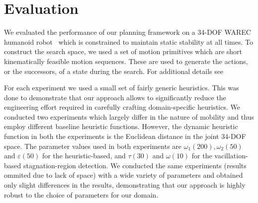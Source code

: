 \documentclass{article}
\begin{document}
\section{Evaluation }
\label{sec:eval}
We evaluated the performance of our planning framework on a 34-DOF WAREC humanoid robot~\cite{MHSetal15} 
which is constrained to maintain static stability at all times. 
%
To construct the search space, we used a set of motion primitives which are short kinematically feasible motion sequences. 
These are used to generate the actions, or the successors, of a state during the search. 
For additional details see~\cite{DL18}


For each experiment we used a small set of fairly generic heuristics. 
This was done to demonstrate that our approach allows to significantly reduce the engineering effort required in carefully crafting domain-specific heuristics. 
We conducted two experiments which largely differ in the nature of mobility and thus employ different baseline heuristic functions. 
However, the dynamic heuristic function in both the experiments is the Euclidean distance in the joint 34-DOF space.
The parameter values used in both experiments are $\omega_1 (200), \omega_2 (50)$ and $\varepsilon (50)$ for the heuristic-based, and $\tau (30)$ and $\omega (10)$ for the vacillation-based stagnation-region detection.
We conducted the same experiments (results ommited due to lack of space) with a wide variety of parameters and obtained  only slight differences in the results, demonstrating that our approach is highly robust to the choice of parameters for our domain.
\end{document}
